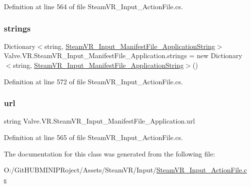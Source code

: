 Definition at line 564 of file Steam\+V\+R\+\_\+\+Input\+\_\+\+Action\+File.\+cs.

\mbox{\label{class_valve_1_1_v_r_1_1_steam_v_r___input___manifest_file___application_a7f4c9d62b0c5a90e0b26498faa85f27f}} 
\subsubsection{\texorpdfstring{strings}{strings}}
{\footnotesize\ttfamily Dictionary$<$string, \mbox{\hyperlink{class_valve_1_1_v_r_1_1_steam_v_r___input___manifest_file___application_string}{Steam\+V\+R\+\_\+\+Input\+\_\+\+Manifest\+File\+\_\+\+Application\+String}}$>$ Valve.\+V\+R.\+Steam\+V\+R\+\_\+\+Input\+\_\+\+Manifest\+File\+\_\+\+Application.\+strings = new Dictionary$<$string, \mbox{\hyperlink{class_valve_1_1_v_r_1_1_steam_v_r___input___manifest_file___application_string}{Steam\+V\+R\+\_\+\+Input\+\_\+\+Manifest\+File\+\_\+\+Application\+String}}$>$()}



Definition at line 572 of file Steam\+V\+R\+\_\+\+Input\+\_\+\+Action\+File.\+cs.

\mbox{\label{class_valve_1_1_v_r_1_1_steam_v_r___input___manifest_file___application_afe02d2c838a9022c98558a0f3627b1c0}} 
\subsubsection{\texorpdfstring{url}{url}}
{\footnotesize\ttfamily string Valve.\+V\+R.\+Steam\+V\+R\+\_\+\+Input\+\_\+\+Manifest\+File\+\_\+\+Application.\+url}



Definition at line 565 of file Steam\+V\+R\+\_\+\+Input\+\_\+\+Action\+File.\+cs.



The documentation for this class was generated from the following file\+:\begin{DoxyCompactItemize}
\item 
O\+:/\+Git\+H\+U\+B\+M\+I\+N\+I\+P\+Roject/\+Assets/\+Steam\+V\+R/\+Input/\mbox{\hyperlink{_steam_v_r___input___action_file_8cs}{Steam\+V\+R\+\_\+\+Input\+\_\+\+Action\+File.\+cs}}\end{DoxyCompactItemize}
